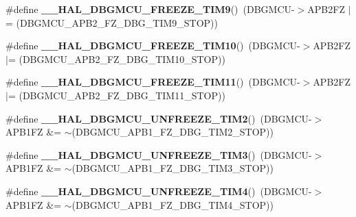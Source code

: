 \begin{DoxyCompactItemize}
\item 
\mbox{\label{group___h_a_l___exported___macros_ga391a0780e10993d06c519addf582a438}} 
\#define {\bfseries \+\_\+\+\_\+\+H\+A\+L\+\_\+\+D\+B\+G\+M\+C\+U\+\_\+\+F\+R\+E\+E\+Z\+E\+\_\+\+T\+I\+M9}()~(D\+B\+G\+M\+CU-\/$>$A\+P\+B2\+FZ $\vert$= (D\+B\+G\+M\+C\+U\+\_\+\+A\+P\+B2\+\_\+\+F\+Z\+\_\+\+D\+B\+G\+\_\+\+T\+I\+M9\+\_\+\+S\+T\+OP))
\item 
\mbox{\label{group___h_a_l___exported___macros_gaee80dea9c85b61d2fb2499cbd97d8478}} 
\#define {\bfseries \+\_\+\+\_\+\+H\+A\+L\+\_\+\+D\+B\+G\+M\+C\+U\+\_\+\+F\+R\+E\+E\+Z\+E\+\_\+\+T\+I\+M10}()~(D\+B\+G\+M\+CU-\/$>$A\+P\+B2\+FZ $\vert$= (D\+B\+G\+M\+C\+U\+\_\+\+A\+P\+B2\+\_\+\+F\+Z\+\_\+\+D\+B\+G\+\_\+\+T\+I\+M10\+\_\+\+S\+T\+OP))
\item 
\mbox{\label{group___h_a_l___exported___macros_gac1f554993a6d5c7a953dab2c6cc564dd}} 
\#define {\bfseries \+\_\+\+\_\+\+H\+A\+L\+\_\+\+D\+B\+G\+M\+C\+U\+\_\+\+F\+R\+E\+E\+Z\+E\+\_\+\+T\+I\+M11}()~(D\+B\+G\+M\+CU-\/$>$A\+P\+B2\+FZ $\vert$= (D\+B\+G\+M\+C\+U\+\_\+\+A\+P\+B2\+\_\+\+F\+Z\+\_\+\+D\+B\+G\+\_\+\+T\+I\+M11\+\_\+\+S\+T\+OP))
\item 
\mbox{\label{group___h_a_l___exported___macros_gafd40134436233985a840e1cd8eb6c4c3}} 
\#define {\bfseries \+\_\+\+\_\+\+H\+A\+L\+\_\+\+D\+B\+G\+M\+C\+U\+\_\+\+U\+N\+F\+R\+E\+E\+Z\+E\+\_\+\+T\+I\+M2}()~(D\+B\+G\+M\+CU-\/$>$A\+P\+B1\+FZ \&= $\sim$(D\+B\+G\+M\+C\+U\+\_\+\+A\+P\+B1\+\_\+\+F\+Z\+\_\+\+D\+B\+G\+\_\+\+T\+I\+M2\+\_\+\+S\+T\+OP))
\item 
\mbox{\label{group___h_a_l___exported___macros_ga5aecefa008a37ef7c6489a2e29415e69}} 
\#define {\bfseries \+\_\+\+\_\+\+H\+A\+L\+\_\+\+D\+B\+G\+M\+C\+U\+\_\+\+U\+N\+F\+R\+E\+E\+Z\+E\+\_\+\+T\+I\+M3}()~(D\+B\+G\+M\+CU-\/$>$A\+P\+B1\+FZ \&= $\sim$(D\+B\+G\+M\+C\+U\+\_\+\+A\+P\+B1\+\_\+\+F\+Z\+\_\+\+D\+B\+G\+\_\+\+T\+I\+M3\+\_\+\+S\+T\+OP))
\item 
\mbox{\label{group___h_a_l___exported___macros_gac73202fc9f0913f52ef70c42b6cab287}} 
\#define {\bfseries \+\_\+\+\_\+\+H\+A\+L\+\_\+\+D\+B\+G\+M\+C\+U\+\_\+\+U\+N\+F\+R\+E\+E\+Z\+E\+\_\+\+T\+I\+M4}()~(D\+B\+G\+M\+CU-\/$>$A\+P\+B1\+FZ \&= $\sim$(D\+B\+G\+M\+C\+U\+\_\+\+A\+P\+B1\+\_\+\+F\+Z\+\_\+\+D\+B\+G\+\_\+\+T\+I\+M4\+\_\+\+S\+T\+OP))

\end{DoxyCompactItemize}
